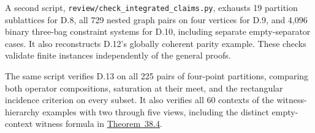 
A second script, \texttt{review/check\_integrated\_claims.py}, exhausts 19 partition sublattices for D.8, all 729 nested graph pairs on four vertices for D.9, and 4,096 binary three-bag constraint systems for D.10, including separate empty-separator cases. It also reconstructs D.12's globally coherent parity example. These checks validate finite instances independently of the general proofs.

The same script verifies D.13 on all 225 pairs of four-point partitions, comparing both operator compositions, saturation at their meet, and the rectangular incidence criterion on every subset. It also verifies all 60 contexts of the witness-hierarchy examples with two through five views, including the distinct empty-context witness formula in \hyperlink{stmt:38.4}{Theorem~38.4}.
